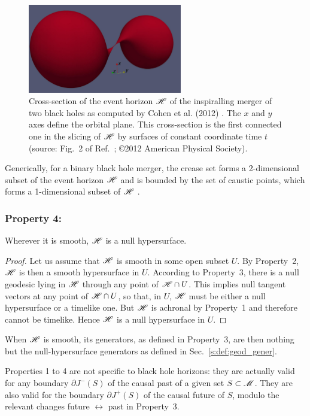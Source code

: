 \begin{figure}
\centerline{\includegraphics[width=0.6\textwidth]{glo_EH_binspir.jpg}}
\caption[]{\label{f:glo:EH_binspir} \footnotesize
Cross-section of the event horizon $\mathscr{H}$ of the inspiralling merger of
two black holes as computed by Cohen et al. (2012) \cite{CohenKS12}.
The $x$ and $y$ axes define the orbital plane.
This cross-section is the first connected one in the slicing of $\mathscr{H}$
by surfaces of constant coordinate time $t$
(source: Fig.~2 of Ref.~\cite{CohenKS12}; \copyright 2012 American Physical Society).}
\end{figure}

Generically, for a binary black hole merger,
the crease set forms a 2-dimensional subset of the event horizon
$\mathscr{H}$ and is bounded by the set of caustic points, which forms a 1-dimensional
subset of $\mathscr{H}$ \cite{Siino98a,Siino98b,HusaW99,CohenKS12}.

\subsubsection{Property 4:}
\begin{greybox}
Wherever it is smooth, $\mathscr{H}$ is a null hypersurface.
\end{greybox}
\begin{proof}
Let us assume that $\mathscr{H}$ is smooth in some open subset $U$.
By Property~2, $\mathscr{H}$ is then a smooth hypersurface in $U$.
According to Property~3, there is a null geodesic lying in $\mathscr{H}$ through
any point of $\mathscr{H}\cap U$.
This implies null tangent vectors at any point of $\mathscr{H}\cap U$, so that, in $U$,
$\mathscr{H}$ must be either a null hypersurface or a timelike one. But $\mathscr{H}$ is achronal by Property~1 and therefore cannot be timelike. Hence $\mathscr{H}$ is a null hypersurface in $U$.
\end{proof}
When $\mathscr{H}$ is smooth, its generators,
as defined in Property~3, are then nothing but the
null-hypersurface generators as defined in Sec.~\ref{s:def:geod_gener}.

\begin{remark}
Properties 1 to 4 are not specific to black hole horizons: they are actually
valid for any boundary $\partial J^-(S)$ of the causal past of a given set $S\subset\mathscr{M}$.
They are also valid for the boundary $\partial J^+(S)$ of the causal future of
$S$, modulo the relevant changes future $\leftrightarrow$ past in Property~3.
\end{remark}


